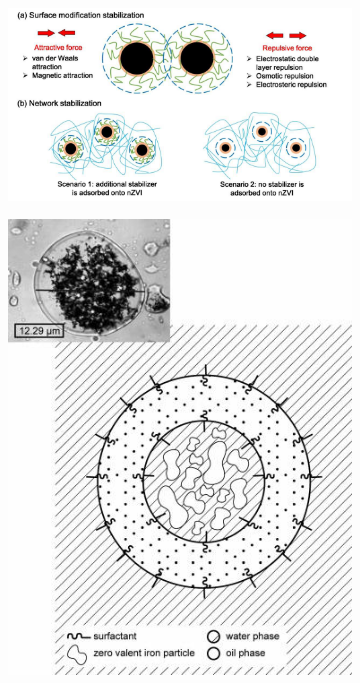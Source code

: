 \begin{figure}[h]
    \begin{subfigure}{.5\textwidth}
		\centering
		\includegraphics[width=\textwidth]{figs/fig1.png}
	\end{subfigure}
    
	\begin{subfigure}{.5\textwidth}
		\centering
		\includegraphics[width=\textwidth]{figs/fig2.png}
	\end{subfigure}
    \label{fig1}
\end{figure}

